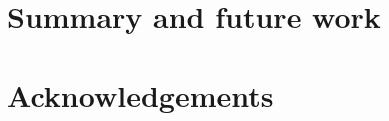 \chapter{Summary and future work}

\chapter*{Acknowledgements}

\newpage

\renewcommand{\bibname}{References}


{}



